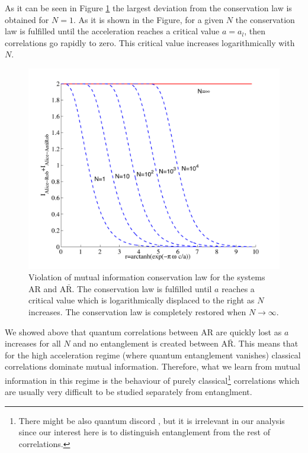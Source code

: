 As it can be seen in Figure \ref{conserva} the largest deviation from the conservation law is obtained for $N=1$. As it is shown in the Figure, for a given $N$ the conservation law is fulfilled until the acceleration reaches a critical value $a=a_{l}$, then correlations go rapidly to zero. This critical value increases logarithmically with $N$. 

\begin{figure}[h]
\begin{center}
\includegraphics[width=.85\textwidth]{conserva}
\end{center}
\caption{ Violation of mutual information conservation law for the systems AR and $\text{A}{\bar{\text{R}}}$. The conservation law is fulfilled until $a$ reaches a critical value which is logarithmically displaced to the right as $N$ increases. The conservation law is completely restored when $N\rightarrow\infty$.}
\label{conserva}
\end{figure}



We showed above that quantum correlations between AR are quickly lost as $a$ increases for all $N$  and no entanglement is created between $\text{A}{\bar{\text{R}}}$. This means that for the high acceleration regime (where quantum entanglement vanishes) classical correlations dominate mutual information. Therefore, what we learn from mutual information in this regime is the behaviour of purely classical\footnote{There might be also quantum discord \cite{Discord}, but it is irrelevant in our analysis since our interest here is to distinguish entanglement from the rest of correlations.} correlations which are usually very difficult to be studied separately from entanglment.

